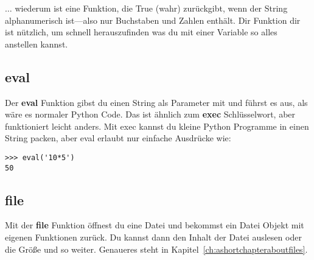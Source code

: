 $\ldots$ wiederum ist eine Funktion, die True (wahr) zurückgibt, wenn der String alphanumerisch ist---also nur Buchstaben und Zahlen enthält. Dir Funktion dir ist nützlich, um schnell herauszufinden was du mit einer Variable so alles anstellen kannst. 

\subsection*{eval}

Der \textbf{eval} Funktion gibst du einen String als Parameter mit und führst es aus, als wäre es normaler Python Code. Das ist ähnlich zum \textbf{exec} Schlüsselwort, aber funktioniert leicht anders. Mit exec kannst du kleine Python Programme in einen String packen, aber eval erlaubt nur einfache Ausdrücke wie:

\begin{Verbatim}[frame=single]
>>> eval('10*5')
50
\end{Verbatim}

\subsection*{file}

Mit der \textbf{file} Funktion öffnest du eine Datei und bekommst ein Datei Objekt mit eigenen Funktionen zurück. Du kannst dann den Inhalt der Datei auslesen oder die Größe und so weiter. Genaueres steht in Kapitel~\ref{ch:ashortchapteraboutfiles}.

